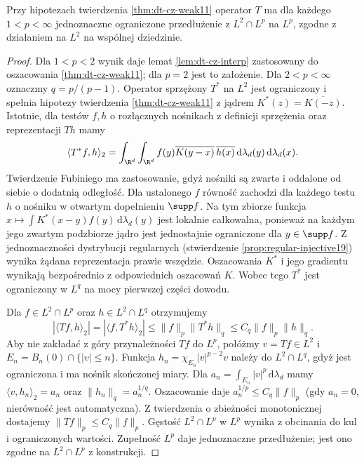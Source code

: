 \begin{twierdzenie}
\label{thm:dt-cz-general-lp}
Przy hipotezach twierdzenia \ref{thm:dt-cz-weak11}
operator $T$ ma dla każdego $1<p<\infty$ jednoznaczne
ograniczone przedłużenie z $L^2\cap L^p$ na $L^p$,
zgodne z działaniem na $L^2$ na wspólnej dziedzinie.
\end{twierdzenie}
\begin{proof}
Dla $1<p<2$ wynik daje lemat
\ref{lem:dt-cz-interp} zastosowany do oszacowania
\ref{thm:dt-cz-weak11}; dla $p=2$ jest to założenie.
Dla $2<p<\infty$ oznaczmy $q=p/(p-1)$.
Operator sprzężony $T^*$ na $L^2$ jest ograniczony
i spełnia hipotezy twierdzenia \ref{thm:dt-cz-weak11}
z jądrem $K^*(z)=\overline{K(-z)}$.
Istotnie, dla testów $f,h$ o rozłącznych nośnikach
z definicji sprzężenia oraz reprezentacji $Th$ mamy
\[
 \langle T^*f,h\rangle_2
 =\int_{\R^d}\int_{\R^d}f(y)
 \overline{K(y-x)}\,\overline{h(x)}
 \,\mathrm d\lambda_d(y)\,\mathrm d\lambda_d(x).
\]
Twierdzenie Fubiniego ma zastosowanie, gdyż nośniki
są zwarte i oddalone od siebie o dodatnią odległość.
Dla ustalonego $f$ równość zachodzi dla każdego testu
$h$ o nośniku w otwartym dopełnieniu $\supp f$.
Na tym zbiorze funkcja
$x\mapsto\int K^*(x-y)f(y)\,\mathrm d\lambda_d(y)$
jest lokalnie całkowalna, ponieważ na każdym jego
zwartym podzbiorze jądro jest jednostajnie ograniczone
dla $y\in\supp f$. Z jednoznaczności dystrybucji
regularnych (stwierdzenie \ref{prop:regular-injective19})
wynika żądana reprezentacja prawie wszędzie.
Oszacowania $K^*$ i jego gradientu wynikają
bezpośrednio z odpowiednich oszacowań $K$.
Wobec tego $T^*$ jest ograniczony w $L^q$
na mocy pierwszej części dowodu.

Dla $f\in L^2\cap L^p$ oraz $h\in L^2\cap L^q$
otrzymujemy
\[
 |\langle Tf,h\rangle_2|
 =|\langle f,T^*h\rangle_2|
 \le\|f\|_p\|T^*h\|_q
 \le C_q\|f\|_p\|h\|_q.
\]
Aby nie zakładać z góry przynależności $Tf$ do $L^p$,
połóżmy $v=Tf\in L^2$ i
$E_n=B_n(0)\cap\{|v|\le n\}$. Funkcja
$h_n=\chi_{E_n}|v|^{p-2}v$ należy do $L^2\cap L^q$,
gdyż jest ograniczona i ma nośnik skończonej miary.
Dla $a_n=\int_{E_n}|v|^p\,\mathrm d\lambda_d$ mamy
$\langle v,h_n\rangle_2=a_n$ oraz $\|h_n\|_q=a_n^{1/q}$.
Oszacowanie daje $a_n^{1/p}\le C_q\|f\|_p$
(gdy $a_n=0$, nierówność jest automatyczna).
Z twierdzenia o zbieżności monotonicznej dostajemy
$\|Tf\|_p\le C_q\|f\|_p$.
Gęstość $L^2\cap L^p$ w $L^p$ wynika z obcinania
do kul i ograniczonych wartości. Zupełność $L^p$
daje jednoznaczne przedłużenie; jest ono zgodne
na $L^2\cap L^p$ z konstrukcji.
\end{proof}

